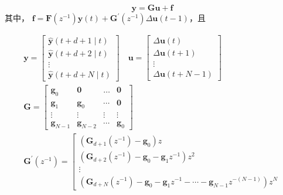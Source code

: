 \begin{equation}
    \mathbf{y}=\mathbf{Gu}+\mathbf{f}
    \label{eq:prediction model 3}
\end{equation}
其中， $\mathbf{f} = \mathbf{F}\left(z^{-1}\right) \boldsymbol{y}(t)+\mathbf{G}^{\prime}\left(z^{-1}\right) \Delta \boldsymbol{u}(t-1)$，且\par
\begin{equation}
    \begin{array}{l}
        \mathbf{y} = 
            \left[\begin{array}{c}
                \hat{\boldsymbol{y}}(t+d+1 \mid t) \\
                \hat{\boldsymbol{y}}(t+d+2 \mid t) \\
                \vdots \\
                \hat{\boldsymbol{y}}(t+d+N \mid t)
            \end{array}\right]
        \quad \mathbf{u} = 
            \left[\begin{array}{c}
                \Delta \boldsymbol{u}(t) \\
                \Delta \boldsymbol{u}(t+1) \\
                \vdots \\
                \Delta \boldsymbol{u}(t+N-1)
            \end{array}\right] \\ 
        \mathbf{G} = 
            \left[\begin{array}{cccc}
                \boldsymbol{g}_{0} & \boldsymbol{0} & \ldots & \boldsymbol{0} \\
                \boldsymbol{g}_{1} & \boldsymbol{g}_{0} & \cdots & \boldsymbol{0} \\
                \vdots & \vdots & \vdots & \vdots \\
                \boldsymbol{g}_{N-1} & \boldsymbol{g}_{N-2} & \cdots & \boldsymbol{g}_{0}
            \end{array}\right] \\ 
        \mathbf{G}^{\prime}\left(z^{-1}\right) = 
            \left[\begin{array}{c}
                \left(\boldsymbol{G}_{d+1}\left(z^{-1}\right)-\boldsymbol{g}_{0}\right)z \\
                \left(\boldsymbol{G}_{d+2}\left(z^{-1}\right)-\boldsymbol{g}_{0}-\boldsymbol{g}_{1}z^{-1}\right)z^{2} \\
                \vdots \\
                \left(\boldsymbol{G}_{d+N}\left(z^{-1}\right)-\boldsymbol{g}_{0}-\boldsymbol{g}_{1} z^{-1}-\cdots-\boldsymbol{g}_{N-1} z^{-(N-1)}\right)z^{N}

\end{array}
\end{array}
\end{equation}
